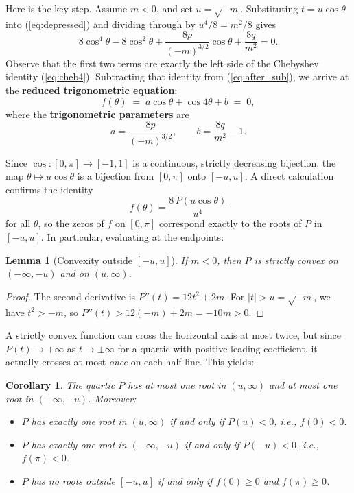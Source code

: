 \documentclass[10pt,a4paper]{amsart}
\newtheorem{lemma}{Lemma}
\newtheorem{corollary}{Corollary}
\begin{document}
Here is the key step. Assume $m < 0$, and set $u = \sqrt{-m}$. Substituting $t = u\cos\theta$ into (\ref{eq:depressed}) and dividing through by $u^4/8 = m^2/8$ gives
\begin{equation}\label{eq:after_sub}
8\cos^4\theta - 8\cos^2\theta + \frac{8p}{(-m)^{3/2}}\cos\theta + \frac{8q}{m^2} = 0.
\end{equation}
Observe that the first two terms are exactly the left side of the Chebyshev identity (\ref{eq:cheb4}). Subtracting that identity from (\ref{eq:after_sub}), we arrive at the \textbf{reduced trigonometric equation}:
\begin{equation}\label{eq:f_def}
\boxed{f(\theta) \;=\; a\cos\theta + \cos 4\theta + b \;=\; 0,}
\end{equation}
where the \textbf{trigonometric parameters} are
\begin{equation}\label{eq:ab}
a = \frac{8p}{(-m)^{3/2}}, \qquad b = \frac{8q}{m^2} - 1.
\end{equation}

Since $\cos\colon [0,\pi] \to [-1,1]$ is a continuous, strictly decreasing bijection, the map $\theta \mapsto u\cos\theta$ is a bijection from $[0,\pi]$ onto $[-u, u]$. A direct calculation confirms the identity
\begin{equation}\label{eq:fP}
f(\theta) = \frac{8\,P(u\cos\theta)}{u^4}
\end{equation}
for all $\theta$, so the zeros of $f$ on $[0,\pi]$ correspond exactly to the roots of $P$ in $[-u, u]$. In particular, evaluating at the endpoints:

\begin{lemma}[{Convexity outside $[-u,u]$}]\label{lem:convex}
If $m < 0$, then $P$ is strictly convex on $(-\infty, -u)$ and on $(u, \infty)$.
\end{lemma}

\begin{proof}
The second derivative is $P''(t) = 12t^2 + 2m$. For $|t| > u = \sqrt{-m}$, we have $t^2 > -m$, so $P''(t) > 12(-m) + 2m = -10m > 0$.
\end{proof}

A strictly convex function can cross the horizontal axis at most twice, but since $P(t) \to +\infty$ as $t \to \pm\infty$ for a quartic with positive leading coefficient, it actually crosses at most \emph{once} on each half-line. This yields:

\begin{corollary}\label{cor:ext}
The quartic $P$ has at most one root in $(u, \infty)$ and at most one root in $(-\infty, -u)$. Moreover:
\begin{itemize}
\item $P$ has exactly one root in $(u, \infty)$ if and only if $P(u) < 0$, i.e., $f(0) < 0$.
\item $P$ has exactly one root in $(-\infty, -u)$ if and only if $P(-u) < 0$, i.e., $f(\pi) < 0$.
\item $P$ has no roots outside $[-u,u]$ if and only if $f(0) \geq 0$ and $f(\pi) \geq 0$.
\end{itemize}
\end{corollary}
\end{document}

